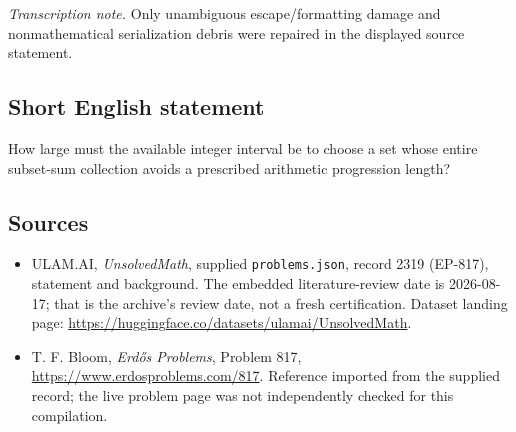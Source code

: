 \documentclass[11pt,a4paper]{article}
\begin{document}
{\small\emph{Transcription note.} Only unambiguous escape/formatting damage and nonmathematical serialization debris were repaired in the displayed source statement.}

\subsection{Short English statement}

How large must the available integer interval be to choose a set whose entire subset-sum collection avoids a prescribed arithmetic progression length?

\subsection{Sources}

{\small

\begin{itemize}

\item[\hypertarget{source:2319:1}{S1}] ULAM.AI, \emph{UnsolvedMath}, supplied \texttt{problems.json}, record 2319 (EP-817), statement and background. The embedded literature-review date is 2026-08-17; that is the archive’s review date, not a fresh certification. Dataset landing page: \url{https://huggingface.co/datasets/ulamai/UnsolvedMath}.

\item[\hypertarget{source:2319:2}{S2}] T. F. Bloom, \emph{Erdős Problems}, Problem 817, \url{https://www.erdosproblems.com/817}. Reference imported from the supplied record; the live problem page was not independently checked for this compilation.

\end{itemize}

}

\label{end:2319}
\end{document}
